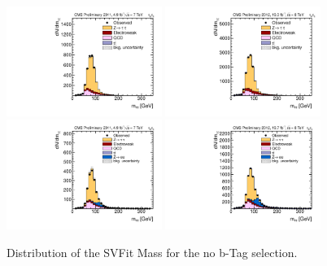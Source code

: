 \begin{figure}[htbp]
  \begin{center}
    \includegraphics[width=0.45\textwidth]{MSSM/ControlPlotsForThesis/muTau/nobtag/m_sv_muTau_2011.pdf}
    \includegraphics[width=0.45\textwidth]{MSSM/ControlPlotsForThesis/muTau/nobtag/m_sv_muTau_2012.pdf}
    \includegraphics[width=0.45\textwidth]{MSSM/ControlPlotsForThesis/eleTau/nobtag/m_sv_eTau_2011.pdf}
    \includegraphics[width=0.45\textwidth]{MSSM/ControlPlotsForThesis/eleTau/nobtag/m_sv_eTau_2012.pdf}
    \caption{
      Distribution of the SVFit Mass for the no b-Tag selection.
    }
    \label{figure:svFitNoBTag}
  \end{center}
\end{figure}

